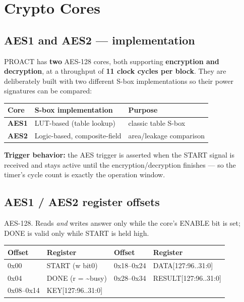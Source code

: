 \documentclass[11pt,a4paper]{report}
\newcommand{\code}[1]{{\ttfamily\small #1}}
\begin{document}
\chapter{Crypto Cores}
\section{AES1 and AES2 --- implementation}
PROACT has \textbf{two} AES-128 cores, both supporting \textbf{encryption and
decryption}, at a throughput of \textbf{11 clock cycles per block}. They are
deliberately built with two different S-box implementations so their power
signatures can be compared:
\begin{center}
\begin{tabular}{lll}
\toprule
Core & S-box implementation & Purpose \\ \midrule
\textbf{AES1} & LUT-based (table lookup) & classic table S-box \\
\textbf{AES2} & Logic-based, composite-field & area/leakage comparison \\
\bottomrule
\end{tabular}\end{center}
\textbf{Trigger behavior:} the AES trigger is asserted when the \code{START}
signal is received and stays active until the encryption/decryption finishes ---
so the timer's cycle count is exactly the operation window.

\section{AES1 / AES2 register offsets}
AES-128. Reads \emph{and} writes answer only while the core's \code{ENABLE} bit
is set; \code{DONE} is valid only while \code{START} is held high.
\begin{center}
\begin{tabular}{ll@{\hskip 2cm}ll}
\toprule
Offset & Register & Offset & Register \\ \midrule
\code{0x00} & START (w bit0) & \code{0x18--0x24} & DATA[127:96..31:0] \\
\code{0x04} & DONE (r = \~{}busy) & \code{0x28--0x34} & RESULT[127:96..31:0] \\
\code{0x08--0x14} & KEY[127:96..31:0] & & \\
\bottomrule
\end{tabular}\end{center}
\end{document}
